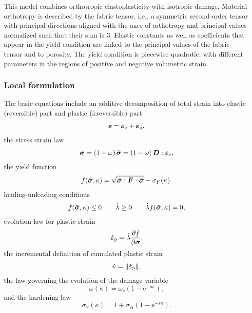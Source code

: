 \documentclass[a4paper]{article}
\newcommand{\mbf}[1]{\mbox{\boldmath$#1$}}
\newcommand{\eps} {\mbf{\varepsilon}}
\newcommand{\epspd} {\dot{\eps}_{\mathrm{p}}}
\newcommand{\veps}{\mbf{\varepsilon}}  %
\newcommand{\vsig}{\mbf{\sigma}}%
\begin{document}
This model combines orthotropic elastoplasticity with isotropic damage.
Material orthotropy is described by the fabric tensor, i.e., a symmetric second-order
tensor with principal directions aligned with the axes of orthotropy and principal
values normalized such that their sum is 3. Elastic constants as well as coefficients
that appear in the yield condition are linked to the principal values of the
fabric tensor and to porosity. The yield condition is piecewise quadratic,
with different parameters in the regions of positive and negative volumetric strain. 

\subsubsection{Local formulation}
The basic equations include an additive decomposition of total strain into elastic (reversible) part and plastic (irreversible) part
\begin{equation}\label{additiveDecomposition}
\veps = \veps_{\rm{e}}+\veps_{\rm{p}},
\end{equation}
the stress strain law
\begin{equation}\label{constitutiveLaw}
\vsig = \left(1-\omega\right)\bar{\vsig}=\left(1-\omega\right)\mbf{D}:{\veps}_{\rm{e}},
\end{equation}
the yield function 
\begin{equation}
f(\bar{\vsig},\kappa) = \sqrt{\bar{\vsig} :\mbf{F}:\bar{\vsig}} - \sigma_Y(\kappa).
\end{equation}
loading-unloading conditions
\begin{equation}
f(\bar{\vsig},\kappa)\le 0 \qquad \dot{\lambda}\geq 0 \qquad \dot{\lambda}f(\bar{\vsig},\kappa)=0,
\end{equation}
evolution law for plastic strain
\begin{equation}
\dot{\veps}_{\rm{p}} = \dot{\lambda} \frac{\partial f}{\partial \bar{\vsig}},
\end{equation}
the incremental definition of cumulated plastic strain
\begin{equation}
\dot{\kappa} = \| \epspd \|,
\end{equation}
the law governing the evolution of the damage variable
\begin{equation}
\omega(\kappa) = \omega_c(1-\mbox{e}^{-a\kappa}),
\end{equation}
and the hardening law
\begin{equation}
\sigma_Y(\kappa) = 1+\sigma_H(1-\mbox{e}^{-s\kappa}).
\end{equation}
\end{document}
